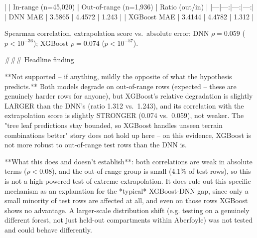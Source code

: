 | | In-range (n=45,020) | Out-of-range (n=1,936) | Ratio (out/in) |
|---|---:|---:|---:|
| DNN MAE | 3.5865 | 4.4572 | 1.243 |
| XGBoost MAE | 3.4144 | 4.4782 | 1.312 |

Spearman correlation, extrapolation score vs.\ absolute error: DNN $\rho=0.059$ ($p<10^{-36}$);
XGBoost $\rho=0.074$ ($p<10^{-57}$).

### Headline finding

**Not supported -- if anything, mildly the opposite of what the hypothesis predicts.** Both
models degrade on out-of-range rows (expected -- these are genuinely harder rows for anyone), but
XGBoost's relative degradation is slightly LARGER than the DNN's (ratio 1.312 vs.\ 1.243), and its
correlation with the extrapolation score is slightly STRONGER (0.074 vs.\ 0.059), not weaker. The
"tree leaf predictions stay bounded, so XGBoost handles unseen terrain combinations better" story
does not hold up here -- on this evidence, XGBoost is not more robust to out-of-range test rows
than the DNN is.

**What this does and doesn't establish**: both correlations are weak in absolute terms
($\rho<0.08$), and the out-of-range group is small (4.1\% of test rows), so this is not a
high-powered test of extreme extrapolation. It does rule out this specific mechanism as an
explanation for the *typical* XGBoost-DNN gap, since only a small minority of test rows are
affected at all, and even on those rows XGBoost shows no advantage. A larger-scale distribution
shift (e.g. testing on a genuinely different forest, not just held-out compartments within
Aberfoyle) was not tested and could behave differently.
